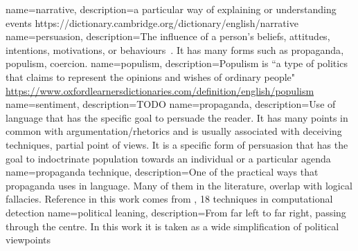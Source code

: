{
        name=narrative,
        description={a particular way of explaining or understanding events 
            https://dictionary.cambridge.org/dictionary/english/narrative
        }
}
{
        name=persuasion,
        description={The influence of a person's beliefs, attitudes, intentions, motivations, or behaviours~\cite{gass2018persuasion}. It has many forms such as \gls{propaganda}, \gls{populism}, coercion.}
}
{
        name=populism,
        description={Populism is ``a type of politics that claims to represent the opinions and wishes of ordinary people" \url{https://www.oxfordlearnersdictionaries.com/definition/english/populism}}
}
{
        name=sentiment,
        description={TODO}
}
{
        name=propaganda,
        description={Use of language that has the specific goal to persuade the reader. It has many points in common with argumentation/rhetorics and is usually associated with deceiving techniques, partial point of views. It is a specific form of persuasion that has the goal to indoctrinate population towards an individual or a particular agenda}
}
{
        name=propaganda technique,
        description={One of the practical ways that propaganda uses in language. Many of them in the literature, overlap with logical fallacies. Reference in this work comes from \cite{TODO}, 18 techniques in computational detection}
}
{
        name=political leaning,
        description={From far left to far right, passing through the centre. In this work it is taken as a wide simplification of political viewpoints}
}
